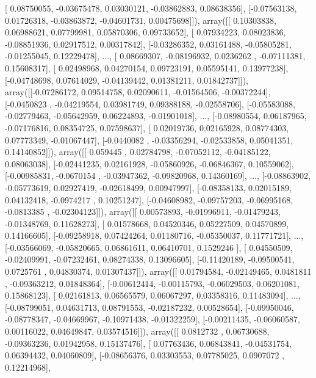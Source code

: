 \documentclass{article}
\begin{document}
       [ 0.08750055, -0.03675478,  0.03030121, -0.03862883,  0.08638356],
       [-0.07563138,  0.01726318, -0.03863872, -0.04601731,  0.00475698]]), array([[ 0.10303838,  0.06988621,  0.07799981,  0.05870306,  0.09733652],
       [ 0.07934223,  0.08023836, -0.08851936,  0.02917512,  0.00317842],
       [-0.03286352,  0.03161488, -0.05805281, -0.01255045,  0.12229478],
       ..., 
       [ 0.08669307, -0.08196932,  0.0236262 , -0.07111381,  0.15608317],
       [ 0.02498968,  0.04270154,  0.09723191,  0.05595141,  0.13977238],
       [-0.04748698,  0.07614029, -0.04139442,  0.01381211,  0.01842737]]), array([[-0.07286172,  0.09514758,  0.02090611, -0.01564506, -0.00372244],
       [-0.0450823 , -0.04219554,  0.03981749,  0.09388188, -0.02558706],
       [-0.05583088, -0.02779463, -0.05642959,  0.06224893, -0.01901018],
       ..., 
       [-0.08980554,  0.06187965, -0.07176816,  0.08354725,  0.07598637],
       [ 0.02019736,  0.02165928,  0.08774303,  0.07773349, -0.01067447],
       [-0.0440082 , -0.03356294, -0.02533858,  0.05041351,  0.14140852]]), array([[ 0.059445  ,  0.02784798, -0.07052112, -0.04185122,  0.08063038],
       [-0.02441235,  0.02161928, -0.05860926, -0.06846367,  0.10559062],
       [-0.00985831, -0.0670154 , -0.03947362, -0.09820968,  0.14360169],
       ..., 
       [-0.08863902, -0.05773619,  0.02927419, -0.02618499,  0.00947997],
       [-0.08358133,  0.02015189,  0.04132418, -0.0974217 ,  0.10251247],
       [-0.04608982, -0.09757203, -0.06995168, -0.0813385 , -0.02304123]]), array([[ 0.00573893, -0.01996911, -0.01479243, -0.01348769,  0.11628273],
       [ 0.01578668,  0.04520346,  0.05227509,  0.04570899,  0.14166605],
       [-0.09258918,  0.07424264,  0.01180716, -0.05350037,  0.11771721],
       ..., 
       [-0.03566069, -0.05820665,  0.06861611,  0.06410701,  0.1529246 ],
       [ 0.04550509, -0.02409991, -0.07232461,  0.08274338,  0.13096605],
       [-0.11420189, -0.09500541,  0.0725761 ,  0.04830374,  0.01307437]]), array([[ 0.01794584, -0.02149465,  0.0481811 , -0.09363212,  0.01848364],
       [-0.00612414, -0.00115793, -0.06029503,  0.06201081,  0.15868123],
       [ 0.02161813,  0.06565579,  0.06067297,  0.03358316,  0.11483094],
       ..., 
       [-0.08799051,  0.04631713,  0.08791553, -0.02187232,  0.00528654],
       [-0.09950046, -0.08778347, -0.04669967, -0.10971438, -0.01322259],
       [-0.00211435, -0.06060587,  0.00116022,  0.04649847,  0.03574516]]), array([[ 0.0812732 ,  0.06730688, -0.09363236,  0.01942958,  0.15137476],
       [ 0.07763436,  0.06843841, -0.04531754,  0.06394432,  0.04060809],
       [-0.08656376,  0.03303553,  0.07785025,  0.0907072 ,  0.12214968],
\end{document}
